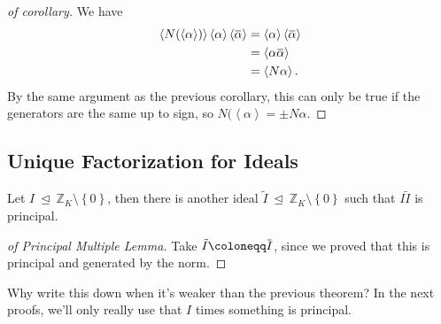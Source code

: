 \begin{proof}[of corollary]

We have
\begin{align*}
\left\langle{ N( \left\langle{ \alpha }\right\rangle  )}\right\rangle 
\left\langle{ \alpha }\right\rangle \left\langle{ \mkern 1.5mu\overline{\mkern-1.5mu\alpha \mkern-1.5mu}\mkern 1.5mu}\right\rangle 
&=
\left\langle{ \alpha }\right\rangle \left\langle{ \mkern 1.5mu\overline{\mkern-1.5mu\alpha \mkern-1.5mu}\mkern 1.5mu}\right\rangle \\
&=
\left\langle{ \alpha\mkern 1.5mu\overline{\mkern-1.5mu\alpha \mkern-1.5mu}\mkern 1.5mu}\right\rangle\\
&= \left\langle{ N \alpha }\right\rangle 
.\end{align*}
By the same argument as the previous corollary, this can only be true if
the generators are the same up to sign, so
\(N( \left\langle{ \alpha }\right\rangle = \pm N \alpha\).

\end{proof}

\hypertarget{unique-factorization-for-ideals}{%
\subsection{Unique Factorization for
Ideals}\label{unique-factorization-for-ideals}}

\begin{lemma}

Let \(I {~\trianglelefteq~}{\mathbb{Z}}_K\setminus\left\{{0}\right\}\),
then there is another ideal
\(\tilde I {~\trianglelefteq~}{\mathbb{Z}}_K\setminus\left\{{0}\right\}\)
such that \(I \tilde I\) is principal.

\end{lemma}

\begin{proof}[of Principal Multiple Lemma]

Take
\(\tilde I \coloneqq\mkern 1.5mu\overline{\mkern-1.5muI\mkern-1.5mu}\mkern 1.5mu\),
since we proved that this is principal and generated by the norm.

\end{proof}

\begin{remark}

Why write this down when it's weaker than the previous theorem? In the
next proofs, we'll only really use that \(I\) times something is
principal.

\end{remark}

